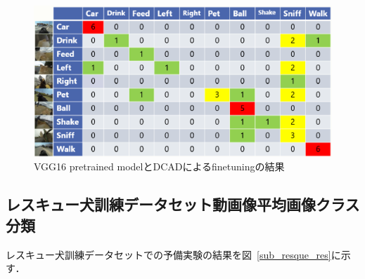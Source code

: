 \begin{figure}[htbp]
   \begin{center}

    \includegraphics[scale=0.5]{./Figures/vgg16_res.eps}
    \caption{VGG16 pretrained modelとDCADによるfinetuningの結果}
    \label{vgg16_res}
   \end{center}
\end{figure}

\subsection{レスキュー犬訓練データセット動画像平均画像クラス分類}
レスキュー犬訓練データセットでの予備実験の結果を図~\ref{sub_resque_res}に示す．


